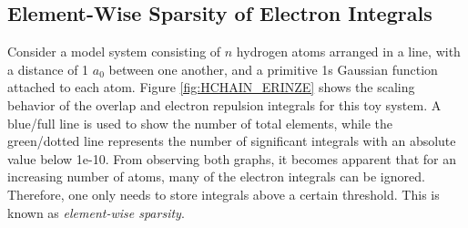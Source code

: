 \FloatBarrier

\subsection{Element-Wise Sparsity of Electron Integrals}

Consider a model system consisting of $n$ hydrogen atoms arranged in a line, with a distance of 1 $a_0$ between one another, and a primitive 1s Gaussian function attached to each atom. Figure \ref{fig:HCHAIN_ERINZE} shows the scaling behavior of the overlap and electron repulsion integrals for this toy system. A blue/full line is used to show the number of total elements, while the green/dotted line represents the number of significant integrals with an absolute value below 1e-10. From observing both graphs, it becomes apparent that for an increasing number of atoms, many of the electron integrals can be ignored. Therefore, one only needs to store integrals above a certain threshold. This is known as \emph{element-wise sparsity}.

